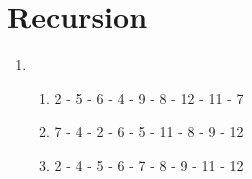 \documentclass[sectionformat = exercise]{gadsescript}
\begin{document}
\maketitle
\section{Recursion}
\begin{enumerate}[label=\alph*)]
	\item 
	\begin{enumerate}[label=\roman*.]
		\item 2 - 5 - 6 - 4 - 9 - 8 - 12 - 11 - 7
		\item 7 - 4 - 2 - 6 - 5 - 11 - 8 - 9 - 12
		\item 2 - 4 - 5 - 6 - 7 - 8 - 9 - 11 - 12
	\end{enumerate}
\end{enumerate}
\end{document}
